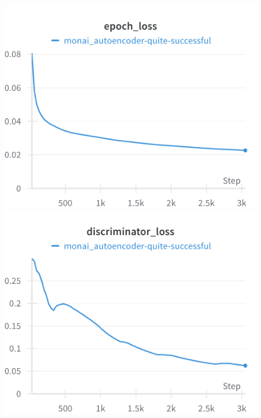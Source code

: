 \begin{figure}[H]
\includegraphics[width=\linewidth]{detailed_engineering/Monai Autoencoder/charts/epoch_loss.png}
\caption{}
\endminipage\hfill
{}
\includegraphics[width=\linewidth]{detailed_engineering/Monai Autoencoder/charts/discriminator_loss.png}
\caption{}
\endminipage
\end{figure}

